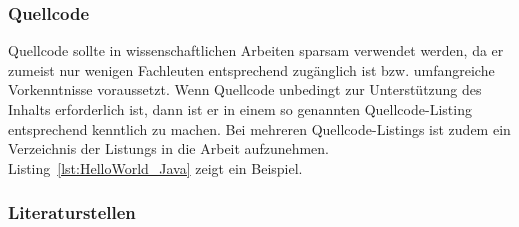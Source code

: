 \subsubsection{Quellcode}
\label{sec:Quellcode}
Quellcode sollte in wissenschaftlichen Arbeiten sparsam verwendet werden, da er zumeist nur wenigen Fachleuten entsprechend zugänglich ist bzw. umfangreiche Vorkenntnisse voraussetzt. Wenn Quellcode unbedingt zur Unterstützung des Inhalts erforderlich ist, dann ist er in einem so genannten Quellcode-Listing entsprechend kenntlich zu machen. Bei mehreren Quellcode-Listings ist zudem ein Verzeichnis der Listungs in die Arbeit aufzunehmen. Listing~\ref{lst:HelloWorld_Java} zeigt ein Beispiel.


\subsubsection{Literaturstellen}
\label{sec:Literaturstellen}

